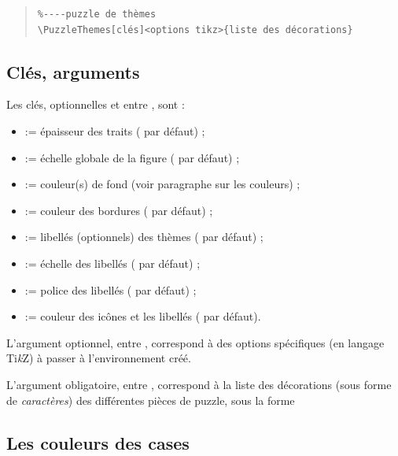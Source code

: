 \documentclass[11pt,a4paper]{ltxdoc}
\providecommand\tikzlogo{Ti\textit{k}Z}
\let\TikZ\tikzlogo
\begin{document}
\begin{quote}
\begin{verbatim}
%----puzzle de thèmes
\PuzzleThemes[clés]<options tikz>{liste des décorations}
\end{verbatim}
\end{quote}

\subsection{Clés, arguments}

Les \textsf{clés}, optionnelles et entre \MontreCode{[...]}, sont :

\begin{itemize}
	\item {} := épaisseur des traits (\MontreCode{1pt} par défaut) ;
	\item {} := échelle globale de la figure ( par défaut) ;
	\item {} := couleur(s) de fond (voir paragraphe sur les couleurs) ;
	\item {} := couleur des bordures ( par défaut) ;
	\item {} := libellés (optionnels) des thèmes (\MontreCode{\{\}} par défaut) ;
	\item {} := échelle des libellés ( par défaut) ;
	\item {} := police des libellés ( par défaut) ;
	\item {} := couleur des icônes et les libellés ( par défaut).
\end{itemize}

\medskip

L'argument optionnel, entre , correspond à des options spécifiques (en langage \TikZ) à passer à l'environnement créé.

\smallskip

L'argument obligatoire, entre , correspond à la liste des décorations (sous forme de \textit{caractères}) des différentes pièces de puzzle, sous la forme 

\subsection{Les couleurs des cases}
\end{document}
